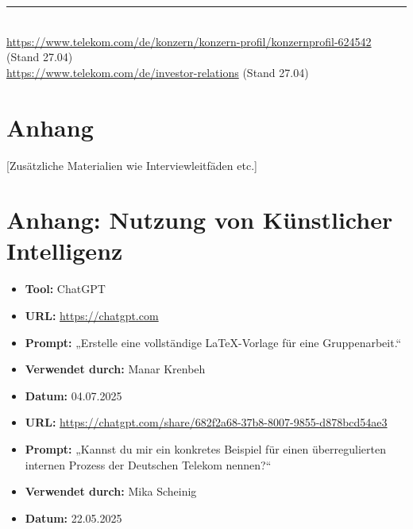 \documentclass[12pt,a4paper]{article}
\begin{document}
	\vspace{0.3cm}
	
	\noindent\footnotesize
	\rule{5cm}{0.4pt} \\
	\href{https://www.telekom.com/de/konzern/konzern-profil/konzernprofil-624542}{https://www.telekom.com/de/konzern/konzern-profil/konzernprofil-624542} (Stand 27.04) \\
	\href{https://www.telekom.com/de/investor-relations}{https://www.telekom.com/de/investor-relations} (Stand 27.04)
	
	
	\newpage
	\newpage
	\section{Anhang}
	[Zusätzliche Materialien wie Interviewleitfäden etc.]
	
	\newpage
	\section{Anhang: Nutzung von Künstlicher Intelligenz}
	\begin{itemize}
		\item \textbf{Tool:} ChatGPT
		\item \textbf{URL:} \url{https://chatgpt.com}
		\item \textbf{Prompt:} „Erstelle eine vollständige LaTeX-Vorlage für eine Gruppenarbeit.“
		\item \textbf{Verwendet durch:} Manar Krenbeh
		\item \textbf{Datum:} 04.07.2025
	\end{itemize}
	\begin{itemize}
		\item \textbf{URL:} \url{https://chatgpt.com/share/682f2a68-37b8-8007-9855-d878bcd54ae3}
		\item \textbf{Prompt:} „Kannst du mir ein konkretes Beispiel für einen überregulierten internen Prozess der Deutschen Telekom nennen?“
		\item \textbf{Verwendet durch:} Mika Scheinig
		\item \textbf{Datum:} 22.05.2025
	\end{itemize}
	
\end{document}
